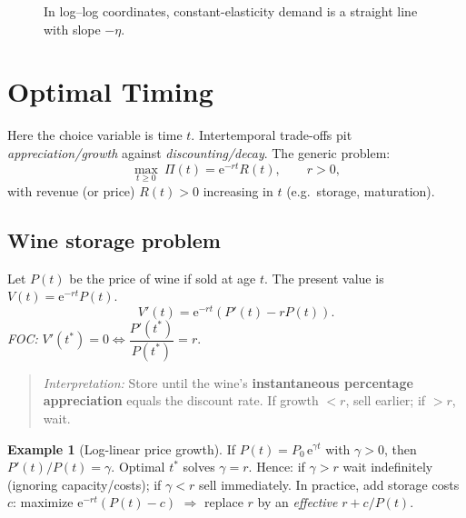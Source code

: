 \documentclass[12pt]{article}
\newcommand{\e}{\mathrm{e}}
\newcommand{\1}{\mathbf{1}}
\theoremstyle{definition}
\newtheorem{example}{Example}
\theoremstyle{plain}
\begin{document}
\begin{figure}[htb]
\centering
{}
\caption{In log–log coordinates, constant-elasticity demand is a straight line with slope $-\eta$.}
\label{fig:loglog-demand}
\end{figure}


\newpage

\section{Optimal Timing}
Here the choice variable is time \(t\). Intertemporal trade-offs pit \emph{appreciation/growth} against \emph{discounting/decay}. The generic problem:
\[
\max_{t\ge 0}\ \Pi(t)=\e^{-rt}R(t),\qquad r>0,
\]
with revenue (or price) \(R(t)>0\) increasing in \(t\) (e.g.\ storage, maturation).

\subsection*{Wine storage problem}
Let \(P(t)\) be the price of wine if sold at age \(t\). The present value is \(V(t)=\e^{-rt}P(t)\).
\[
V'(t)=\e^{-rt}\!\left(P'(t)-rP(t)\right).
\]
\emph{FOC:} \(V'(t^\ast)=0\iff \dfrac{P'(t^\ast)}{P(t^\ast)}=r.\)
\begin{quote}
\emph{Interpretation:} Store until the wine’s \textbf{instantaneous percentage appreciation} equals the discount rate. If growth \(<r\), sell earlier; if \(>r\), wait.
\end{quote}

\begin{example}[Log-linear price growth]
If \(P(t)=P_0\,\e^{\gamma t}\) with \(\gamma>0\), then \(P'(t)/P(t)=\gamma\). Optimal \(t^\ast\) solves \(\gamma=r\). Hence: if \(\gamma>r\) wait indefinitely (ignoring capacity/costs); if \(\gamma<r\) sell immediately. In practice, add storage costs \(c\): maximize \(\e^{-rt}(P(t)-c)\) \(\Rightarrow\) replace \(r\) by an \emph{effective} \(r+c/P(t)\).
\end{example}
\end{document}
